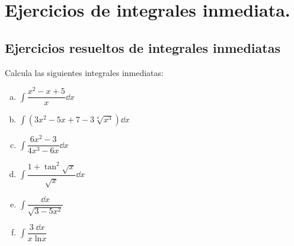 \section{Ejercicios de integrales inmediata.}
\subsection{Ejercicios resueltos de integrales inmediatas}

\begin{ejre} Calcula las siguientes integrales inmediatas:
\begin{multicols}{2}
\begin{enumerate}[a) ]
	\item $\displaystyle \int \dfrac {x^2-x+5}{x} \dd x$
	\item $\displaystyle \int (3x^2-5x+7-3\sqrt[4]{x^3}) \dd x$
	\item $\displaystyle \int \dfrac {6x^2-3}{4x^3-6x} \dd x$
	\item $\displaystyle \int \dfrac {1 + \tan^2 \sqrt{x}}{\sqrt{x}} \dd x$
	\item $\displaystyle \int \dfrac {\dd x}{\sqrt{3-5x^2}}$
	\item $\displaystyle \int \dfrac {3\; \dd x}{x\; \mathrm{ln} x}$
\end{enumerate}	
\end{multicols}
\end{ejre}


